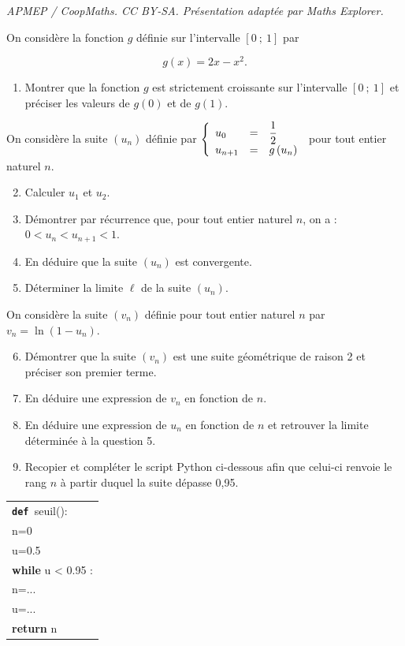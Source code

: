 \documentclass[10pt]{article}
\begin{document}
\noindent\textit{APMEP / CoopMaths. CC BY-SA. Présentation adaptée par Maths Explorer.}\par\medskip
On considère la fonction $g$ définie sur l'intervalle $[0~;~1]$ par 

\[g(x) = 2x - x^{2}.\]

\smallskip

\begin{enumerate}
\item Montrer que la fonction $g$ est strictement croissante sur l'intervalle $[0~;~1]$ et préciser les valeurs de $g(0)$ et de $g(1)$.
\end{enumerate}

On considère la suite $\left(u_{n}\right)$ définie par $\left\{\begin{array}{l c l}u_{0}&=&\dfrac{1}{2}\\ u_{n+1}&=&g\left(u_{n}\right)\end{array}\right.$ pour tout entier naturel $n$.

\begin{enumerate}
\setcounter{enumi}{1}
\item Calculer $u_{1}$ et $u_{2}$.

\item Démontrer par récurrence que, pour tout entier naturel $n$, on a : $0 < u_{n} < u_{n+1}< 1$.
\item En déduire que la suite $\left(u_{n}\right)$ est convergente.
\item Déterminer la limite $\ell$ de la suite $\left(u_{n}\right)$.
\end{enumerate}

On considère la suite $\left(v_{n}\right)$ définie pour tout entier naturel $n$ par $v_{n}=\ln \left(1 - u_{n}\right)$.

\begin{enumerate}
\setcounter{enumi}{5}
\item Démontrer que la suite $\left(v_{n}\right)$ est une suite géométrique de raison 2 et préciser son premier terme.
\item En déduire une expression de $v_{n}$ en fonction de $n$.
\item En déduire une expression de $u_{n}$ en fonction de $n$ et retrouver la limite déterminée à la question 5.
\item Recopier et compléter le script Python ci-dessous afin que celui-ci renvoie le rang $n$ à partir duquel la suite dépasse 0,95.
\end{enumerate}

\begin{center}
\begin{tabular}{|>{\texttt} l|}\hline

\textbf{def }seuil():\\
\qquad n=0\\
\qquad u=0.5\\
\qquad \textbf{while} u < 0.95 :\\
\qquad \qquad n=...\\
\qquad \qquad u=...\\
\qquad \textbf{return} n\\ \hline
\end{tabular}

\end{center}
\end{document}
